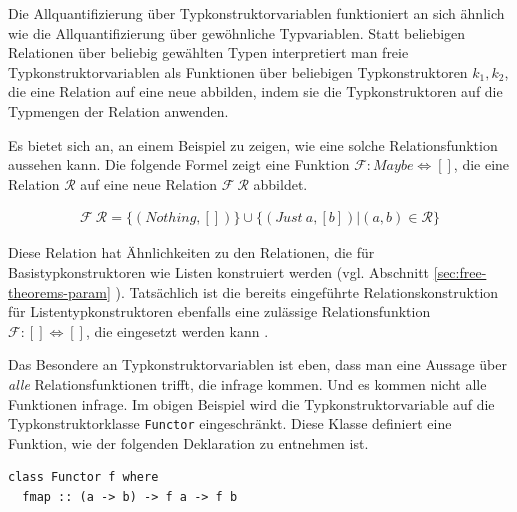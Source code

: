 Die Allquantifizierung über Typkonstruktorvariablen funktioniert an sich ähnlich wie die Allquantifizierung über gewöhnliche
Typvariablen. Statt beliebigen Relationen über beliebig gewählten Typen interpretiert man freie Typkonstruktorvariablen als
Funktionen über beliebigen Typkonstruktoren $k_1, k_2$, die eine Relation auf eine neue abbilden, indem sie die Typkonstruktoren
auf die Typmengen der Relation anwenden.

Es bietet sich an, an einem Beispiel zu zeigen, wie eine solche Relationsfunktion aussehen kann. Die folgende Formel zeigt eine
Funktion $\mathcal{F} : Maybe \Leftrightarrow []$, die eine Relation $\mathcal{R}$ auf eine neue Relation
$\mathcal{F}~\mathcal{R}$ abbildet.

\begin{align*}
\mathcal{F}~\mathcal{R} = \{ (Nothing, []) \} \cup \{(Just\ a, [b]) | (a, b) \in \mathcal{R}\}
\end{align*}

Diese Relation hat Ähnlichkeiten zu den Relationen, die für Basistypkonstruktoren wie Listen konstruiert werden
(vgl. Abschnitt \ref{sec:free-theorems-param} ). Tatsächlich ist die bereits eingeführte
Relationskonstruktion für Listentypkonstruktoren ebenfalls eine zulässige Relationsfunktion $\mathcal{F} : [] \Leftrightarrow []$, die
eingesetzt werden kann .

Das Besondere an Typkonstruktorvariablen ist eben, dass man eine Aussage über \textit{alle} Relationsfunktionen trifft,
die infrage kommen.
Und es kommen nicht alle Funktionen infrage. Im obigen Beispiel wird die Typkonstruktorvariable auf die Typkonstruktorklasse
\texttt{Functor} eingeschränkt. Diese Klasse definiert eine Funktion, wie der folgenden Deklaration zu entnehmen ist.

\begin{verbatim}
class Functor f where
  fmap :: (a -> b) -> f a -> f b
\end{verbatim}

